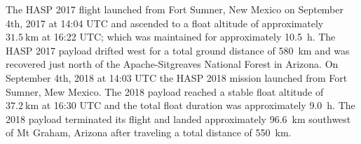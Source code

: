 The HASP 2017 flight launched from Fort Sumner, New Mexico on September 4th, 2017 at 14:04 UTC and ascended to a float altitude of approximately $\SI{31.5}{\kilo\meter}$ at 16:22 UTC; which was maintained for approximately \SI{10.5}{\hour}. The HASP 2017 payload drifted west for a total ground distance of \SI{580}{\kilo\meter} and was recovered just north of the Apache-Sitgreaves National Forest in Arizona.  On September 4th, 2018 at 14:03 UTC the HASP 2018 mission launched from Fort Sumner, Mew Mexico.  The 2018 payload reached a stable float altitude of $\SI{37.2}{\kilo\meter}$ at 16:30 UTC and the total float duration was approximately \SI{9.0}{\hour}. The 2018 payload terminated its flight and landed approximately \SI{96.6}{\kilo\meter} southwest of Mt Graham, Arizona after traveling a total distance of \SI{550}{\kilo\meter}.

